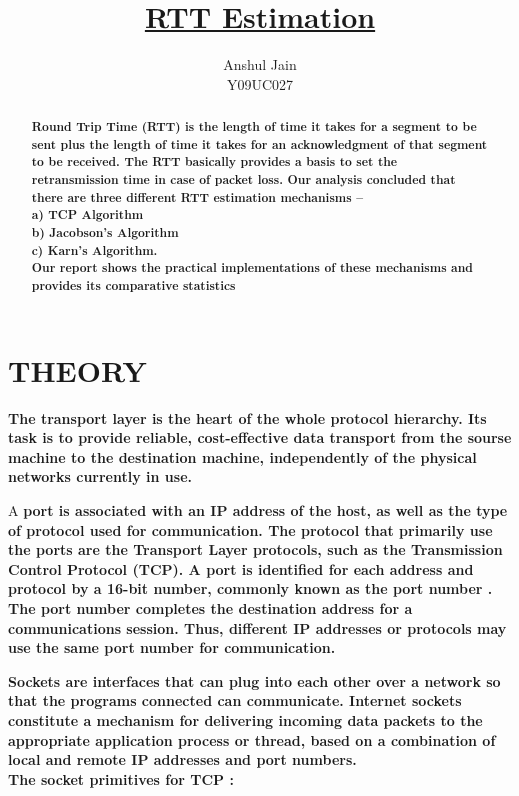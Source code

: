 \documentclass[12pt]{article}
\begin{document}
\title{\underline{RTT  Estimation}}
\author{Anshul Jain\\Y09UC027}
\renewcommand{\today}{November 12, 2011}
\maketitle
\begin{abstract}
\bf Round Trip Time (RTT) \rm is the length of time it takes for a segment to be sent plus the length of time it takes for an acknowledgment of that segment to be received. The RTT basically provides a basis to set the retransmission time in case of packet loss. Our analysis concluded that there are three different RTT estimation mechanisms – \\a) TCP Algorithm \\b) Jacobson’s Algorithm \\c) Karn’s Algorithm.\\Our report shows the practical implementations of these mechanisms and provides its comparative statistics
\end{abstract}
\section{THEORY}
\bf The transport layer \rm  is the heart of the whole protocol hierarchy. Its task is to provide reliable, cost-effective data transport from the sourse machine to the destination machine, independently of the physical networks currently in use.
 
A \bf  port \rm  is associated with an IP address of the host, as well as the type of protocol used for communication. The protocol that primarily use the ports are the Transport Layer protocols, such as the Transmission Control Protocol (TCP). A port is identified for each address and protocol by a 16-bit number, commonly known as the \bf  port number \rm. The port number completes the destination address for a communications session. Thus, different IP addresses or protocols may use the same port number for communication.


\bf Sockets \rm  are interfaces that can  plug into each other over a network  so that the programs connected can communicate.
Internet sockets constitute a mechanism for delivering incoming data packets to the appropriate application process or thread, based on a combination of local and remote IP addresses and port numbers.\\
\newpage
The socket primitives for TCP : 
\end{document}
